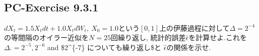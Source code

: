 \documentclass[a4paper,dvipdfmx]{jsarticle}
\newlength{\cellleftmargin}
\newlength{\smallerfontscale}
\def\smaller{\fontsize{\smallerfontscale}{\smallerfontscale}\selectfont}
\begin{document}
\par\vspace{1\smallerfontscale}%
    \begin{addmargin}[\cellleftmargin]{0em}%
    {\smaller%
    \vspace{-1\smallerfontscale}%
    
    \begin{center}
    \end{center}
    { \hspace*{\fill} \\}
    }%
    \end{addmargin}%
    \subsection{PC-Exercise 9.3.1}\label{pc-exercise-9.3.1}

\(dX_t = 1.5 X_t dt + 1.0 X_t dW_t ,\ X_0 =1.0\)という\([0,1]\)上の伊藤過程に対して\(\Delta= 2^{-4}\)の等間隔のオイラー近似を\(N=25\)回繰り返し,
統計的誤差\(\hat{\epsilon}\)を計算せよ.これを\(\Delta . = 2^{-5} , 2^{-6}\)
and \$2\^{}\{-7\} \(についても繰り返し\)\Delta\$と
\(\hat{\epsilon}\)の関係を示せ.

\end{document}

